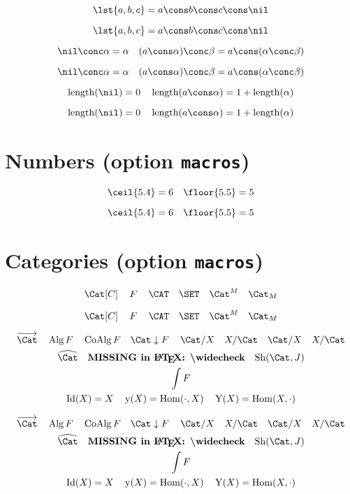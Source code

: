 \documentclass{article}
\renewcommand\hole{\cdot}
\begin{document}
\begin{verbatim*}
\[
\lst{a,b,c}=a\cons b\cons c\cons\nil
\]
\end{verbatim*}
%
\[
  \lst{ a, b, c } = a \cons b \cons c \cons \nil
\]

\begin{verbatim*}
\[
\nil\conc\alpha=\alpha\quad
(a\cons\alpha)\conc\beta=a\cons(\alpha\conc\beta)
\]
\end{verbatim*}
%
\[
  \nil             \conc \alpha = \alpha \quad
  (a \cons \alpha) \conc \beta  = a \cons (\alpha \conc \beta)
\]

\begin{verbatim*}
\[
\length(\nil)=0\quad
\length(a\cons\alpha)=1+\length(\alpha)
\]
\end{verbatim*}
%
\[
  \length(\nil)           = 0 \quad
  \length(a \cons \alpha) = 1 + \length(\alpha)
\]

\section{Numbers (option \texttt{macros})}

\begin{verbatim*}
\[
\ceil{5.4}=6\quad
\floor{5.5}=5
\]
\end{verbatim*}
%
\[
  \ceil{5.4}  = 6 \quad
  \floor{5.5} = 5
\]

\section{Categories (option \texttt{macros})}

\begin{verbatim*}
\[
\Cat[C]\quad
\Fun[F]\quad
\CAT\quad
\SET\quad
\EM[\Cat][\Fun[M]]\quad
\Kl[\Cat][\Fun[M]]
\]
\end{verbatim*}
%
\[
  \Cat[C] \quad
  \Fun[F] \quad
  \CAT \quad
  \SET \quad
  \EM[\Cat][\Fun[M]] \quad
  \Kl[\Cat][\Fun[M]]
\]

\begin{verbatim*}
\begin{gather*}
\Arrow[\Cat]\quad
\Alg{\Fun}\quad
\CoAlg{\Fun}\quad
\Comma[\Cat][\Fun]\quad
\Slice[\Cat][X]\quad
\Coslice[\Cat][X]\quad
\Over[\Cat][X]\quad
\Under[\Cat][X]\\
\Psh[\Cat]\quad
\CoPsh[\Cat]\quad
\Sh[\Cat][J]\\
\Elts[\Fun]\\
\Id(X)=X\quad
\Y(X)=\Hom(\hole,X)\quad
\CoY(X)=\Hom(X,\hole)
\end{gather*}
\end{verbatim*}
%
\begin{gather*}
  \Arrow[\Cat] \quad
  \Alg{\Fun} \quad
  \CoAlg{\Fun} \quad
  \Comma[\Cat][\Fun] \quad
  \Slice[\Cat][X] \quad
  \Coslice[\Cat][X] \quad
  \Over[\Cat][X] \quad
  \Under[\Cat][X] \\
  \Psh[\Cat] \quad
  \CoPsh[\Cat] \quad
  \Sh[\Cat][J] \\
  \Elts[\Fun] \\
  \Id(X) = X \quad
  \Y(X) = \Hom(\hole,X) \quad
  \CoY(X) = \Hom(X,\hole)
\end{gather*}
\end{document}
